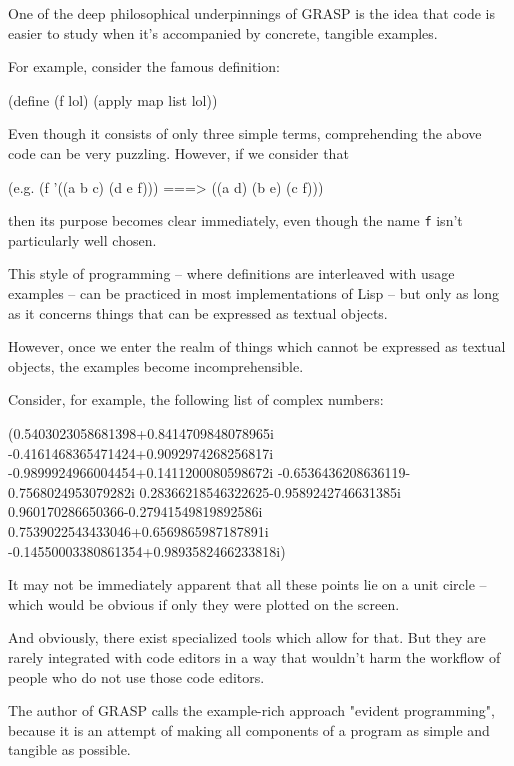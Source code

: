\documentclass[sigconf]{acmart}
\newenvironment{Snippet}{\Verbatim[samepage=true]}{\endVerbatim}
\begin{document}
One of the deep philosophical underpinnings
of GRASP is the idea that code is easier to study
when it's accompanied by concrete, tangible examples.

For example, consider the famous definition:

\begin{Snippet}
(define (f lol)
  (apply map list lol))
\end{Snippet}

  Even though it consists of only three simple terms,
  comprehending the above code can be very puzzling.
  However, if we consider that

\begin{Snippet}
(e.g.
  (f '((a b c)
       (d e f))) ===> ((a d)
		       (b e)
		       (c f)))
\end{Snippet}

then its purpose becomes clear immediately, even though
the name \texttt{f} isn't particularly well chosen.

This style of programming -- where definitions are
interleaved with usage examples -- can be practiced
in most implementations of Lisp -- but only as long
as it concerns things that can be expressed
as textual objects. 

However, once we enter the realm of things which cannot
be expressed as textual objects, the examples become
incomprehensible.

Consider, for example, the following list of complex numbers:

\begin{Snippet}
(0.5403023058681398+0.8414709848078965i 
-0.4161468365471424+0.9092974268256817i
-0.9899924966004454+0.1411200080598672i
-0.6536436208636119-0.7568024953079282i
 0.28366218546322625-0.9589242746631385i 
 0.960170286650366-0.27941549819892586i
 0.7539022543433046+0.6569865987187891i
-0.14550003380861354+0.9893582466233818i)
\end{Snippet}

It may not be immediately apparent that all these points
lie on a unit circle -- which would be obvious if only they
were plotted on the screen.

And obviously, there exist specialized tools
which allow for that. But they are rarely integrated
with code editors in a way that wouldn't harm
the workflow of people who do not use those code
editors.

The author of GRASP calls the example-rich approach
"evident programming", because it is an attempt
of making all components of a program as simple
and tangible as possible.
\end{document}
